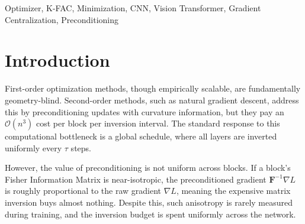 \documentclass[conference]{IEEEtran}
\begin{document}
\begin{abstract}
The current state of the art in deep learning optimization typically employs zeroth-, first-, and second-order gradient updates in isolation. We propose Trinity, a novel optimization framework that unifies these approaches by using zeroth-order curvature sensing for selective natural-gradient preconditioning. Trinity introduces a forward-only second-difference curvature sensor that estimates the effective rank of the Fisher Information Matrix per block at minimal overhead ($\sim$6\%). This sensor output drives a controller that restricts expensive K-FAC inversions to layers where the geometry is highly curved, while an AdamW actuator with magnitude grafting ensures stable scale-safe updates elsewhere. Additionally, the zeroth-order signal acts as a direct saddle-escape actuator. Benchmark evaluations on extreme 100:1 long-tailed label imbalances across diverse architectures demonstrate that Trinity matches the performance of always-on K-FAC at a fraction of the inversion cost.
\end{abstract}

\begin{IEEEkeywords}
Optimizer, K-FAC, Minimization, CNN, Vision Transformer, Gradient Centralization, Preconditioning
\end{IEEEkeywords}



\section{Introduction}
\label{sec:introduction}

First-order optimization methods, though empirically scalable, are fundamentally geometry-blind. Second-order methods, such as natural gradient descent, address this by preconditioning updates with curvature information, but they pay an $\mathcal{O}(n^3)$ cost per block per inversion interval. The standard response to this computational bottleneck is a global schedule, where all layers are inverted uniformly every $\tau$ steps.

However, the value of preconditioning is not uniform across blocks. If a block's Fisher Information Matrix is near-isotropic, the preconditioned gradient $\mathbf{F}^{-1}\nabla L$ is roughly proportional to the raw gradient $\nabla L$, meaning the expensive matrix inversion buys almost nothing. Despite this, such anisotropy is rarely measured during training, and the inversion budget is spent uniformly across the network.
\end{document}
